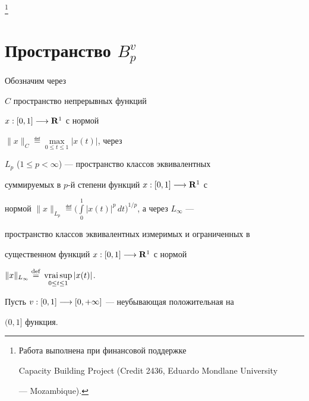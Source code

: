\thanks{Работа выполнена при финансовой поддержке


Capacity Building Project (Credit 2436, Eduardo Mondlane University


--- Mozambique).}





\date{}




\pagestyle{plain} %







\maketitle


\label{begin}





\section{Пространство ${B}_p^v$}





Обозначим через


${C}$ пространство непрерывных функций


$x:[0,1]\longrightarrow{\bold R}^1$ с нормой


$\|x\|_{C}\eqdef\max\limits_{0\le t\le 1}|x(t)|$, через


${L}_p$ ($1\le p<\infty$) --- пространство классов эквивалентных


суммируемых в $p$-й степени функций $x:[0,1]\longrightarrow{\bold R}^1$ с


нормой $\|x\|_{L_p}\eqdef\Big (\int\limits_0^1


|x(t)|^p\,dt \Big)^{1/p}$, а через ${L}_\infty$ ---


пространство классов эквивалентных измеримых и ограниченных в


существенном функций $x:[0,1]\longrightarrow{\bold R}^1$ с нормой


$\|x\|_{L_\infty}\eqdef\vsup{|x(t)|}{0\le t\le 1}$.


Пусть $v :[0,1]\longrightarrow [0,+\infty]$ --- неубывающая положительная на


$(0,1]$ функция.





